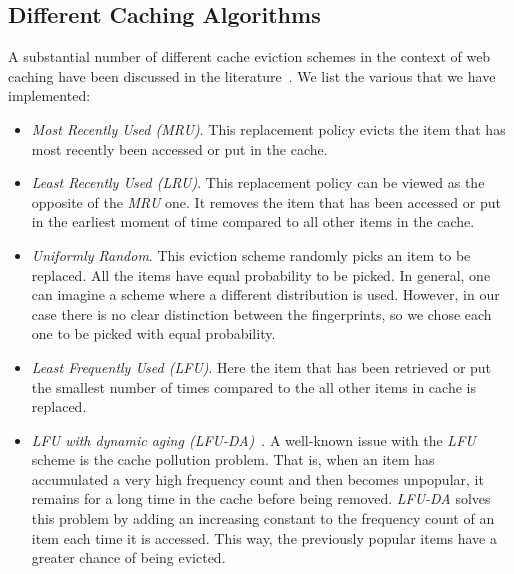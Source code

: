 \subsection{Different Caching Algorithms}
\label{sec:impl_caching}
A substantial number of different cache eviction schemes in the context of web caching have been discussed in the literature~\cite{Wong2006}. We list the various that we have implemented:

\begin{itemize}
\item \textit{Most Recently Used (MRU)}. This replacement policy evicts the item that has most recently been accessed or put in the cache. 

\item \textit{Least Recently Used (LRU)}. This replacement policy can be viewed as the opposite of the \textit{MRU} 
one. It removes the item that has been accessed or put in the earliest moment of time compared to all other items in the 
cache.

\item \textit{Uniformly Random}. This eviction scheme randomly picks an item to be replaced. All the items have equal 
probability to be picked. In general, one can imagine a scheme where a 
different distribution is used. However, in our case there is no clear distinction between the fingerprints, so we
chose each one to be picked with equal probability.

\item \textit{Least Frequently Used (LFU)}. Here the item that has been retrieved or put the smallest number of times compared
to the all other items in cache is replaced.

\item \textit{LFU with dynamic aging (LFU-DA)}~\cite{Podlipnig2003}. A well-known issue with the \textit{LFU} scheme is
the cache pollution problem. That is, when an item has accumulated a very high frequency count and then becomes unpopular,
it remains for a long time in the cache before being removed. \textit{LFU-DA} solves this problem by adding an increasing constant to the frequency count of an item each time it is accessed. This way, the previously popular items have a greater chance of being evicted. 

\end{itemize}
